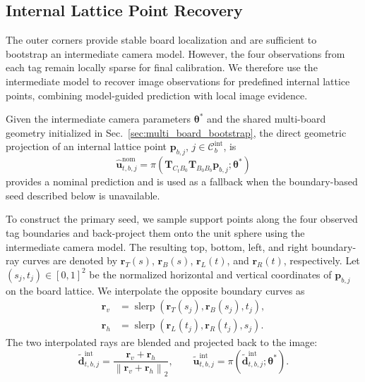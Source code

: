 \documentclass[letterpaper, 10 pt, conference]{ieeeconf}  %
\begin{document}
\subsection{Internal Lattice Point Recovery}
\label{sec:internal_point_recovery}

The outer corners provide stable board localization and are sufficient
to bootstrap an intermediate camera model. However, the four
observations from each tag remain locally sparse for final calibration.
We therefore use the intermediate model to recover image observations
for predefined internal lattice points, combining model-guided
prediction with local image evidence.

Given the intermediate camera parameters $\boldsymbol{\theta}^{*}$ and
the shared multi-board geometry initialized in
Sec.~\ref{sec:multi_board_bootstrap}, the direct geometric projection
of an internal lattice point
$\mathbf{p}_{b,j}$, $j\in\mathcal{C}^{\mathrm{int}}_b$, is
\begin{equation}
\widehat{\mathbf{u}}^{\mathrm{nom}}_{t,b,j}
=
\pi\!\left(
\mathbf{T}_{C_tB_0}
\mathbf{T}_{B_0B_b}
\mathbf{p}_{b,j};
\boldsymbol{\theta}^{*}
\right)
\label{eq:nominal_internal_prediction}
\end{equation}
provides a nominal prediction and is used as a fallback when the
boundary-based seed described below is unavailable.

To construct the primary seed, we sample support points along the four
observed tag boundaries and back-project them onto the unit sphere using
the intermediate camera model. The resulting top, bottom, left, and
right boundary-ray curves are denoted by
$\mathbf{r}_{T}(s)$, $\mathbf{r}_{B}(s)$,
$\mathbf{r}_{L}(t)$, and $\mathbf{r}_{R}(t)$, respectively.
Let $(s_j,t_j)\in[0,1]^2$ be the normalized horizontal and vertical
coordinates of $\mathbf{p}_{b,j}$ on the board lattice. We interpolate
the opposite boundary curves as
\begin{equation}
\begin{aligned}
\mathbf{r}_{v}
&=
\operatorname{slerp}\!\left(
\mathbf{r}_{T}(s_j),
\mathbf{r}_{B}(s_j),
t_j
\right),\\
\mathbf{r}_{h}
&=
\operatorname{slerp}\!\left(
\mathbf{r}_{L}(t_j),
\mathbf{r}_{R}(t_j),
s_j
\right).
\end{aligned}
\label{eq:spherical_boundary_interpolation}
\end{equation}
The two interpolated rays are blended and projected back to the image:
\begin{equation}
\widetilde{\mathbf{d}}^{\mathrm{int}}_{t,b,j}
=
\frac{\mathbf{r}_{v}+\mathbf{r}_{h}}
{\left\|\mathbf{r}_{v}+\mathbf{r}_{h}\right\|_2},
\qquad
\widetilde{\mathbf{u}}^{\mathrm{int}}_{t,b,j}
=
\pi\!\left(
\widetilde{\mathbf{d}}^{\mathrm{int}}_{t,b,j};
\boldsymbol{\theta}^{*}
\right).
\label{eq:internal_point_seed}
\end{equation}
\end{document}
